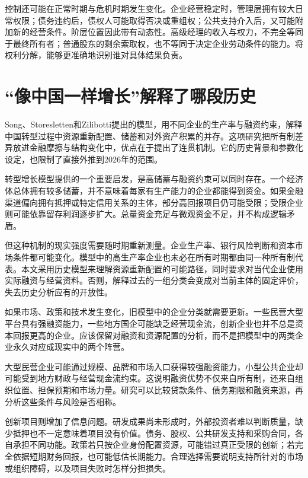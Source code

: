 \documentclass[UTF8,fontset=fandol,zihao=-4,oneside,openany]{ctexbook}
\begin{document}
控制还可能在正常时期与危机时期发生变化。企业经营稳定时，管理层拥有较大日常权限；债务违约后，债权人可能取得否决或重组权；公共支持介入后，又可能附加新的经营条件。阶层位置因此带有动态性。高级经理的收入与权力，不完全等同于最终所有者；普通股东的剩余索取权，也不等同于决定企业劳动条件的能力。将权利分解，能够更准确地识别谁对具体结果负责。

\section{“像中国一样增长”解释了哪段历史}
Song、Storesletten和Zilibotti提出的模型，用不同企业的生产率与融资约束，解释中国转型过程中资源重新配置、储蓄和对外资产积累的并存。这项研究把所有制差异放进金融摩擦与结构变化中，优点在于提出了连贯机制。它的历史背景和参数化设定，也限制了直接外推到2026年的范围。\cite{Song2011}

\label{arg:P082}
转型增长模型提供的一个重要启发，是高储蓄与融资约束可以同时存在。一个经济体总体拥有较多储蓄，并不意味着每家有生产能力的企业都能得到资金。如果金融渠道偏向拥有抵押或特定信用关系的主体，部分高回报项目仍可能受限；受限企业则可能依靠留存利润逐步扩大。总量资金充足与微观资金不足，并不构成逻辑矛盾。

但这种机制的现实强度需要随时期重新测量。企业生产率、银行风险判断和资本市场条件都可能变化。模型中的高生产率企业也未必在所有时期都由同一种所有制代表。本文采用历史模型来理解资源重新配置的可能路径，同时要求对当代企业使用实际融资与经营资料。否则，解释过去的一组分类会变成对当前主体的固定评价，失去历史分析应有的开放性。

如果市场、政策和技术发生变化，旧模型中的企业分类就需要更新。一些民营大型平台具有强融资能力，一些地方国企可能缺乏经营现金流，创新企业也并不总是资本回报更高的企业。应该保留对融资和资源配置的分析，而不是把模型中的两类企业永久对应成现实中的两个阵营。

\label{arg:P083}
大型民营企业可能通过规模、品牌和市场入口获得较强融资能力，小型公共企业却可能受到地方财政与经营现金流约束。这说明融资优势不仅来自所有制，还来自组织位置、担保预期和市场力量。研究可以比较贷款条件、债务期限和融资来源，再分析这些条件与风险是否相称。

创新项目则增加了信息问题。研发成果尚未形成时，外部投资者难以判断质量，缺少抵押也不一定意味着项目没有价值。债务、股权、公共研发支持和采购合同，各自承担不同功能。政策若只按企业身份配置资源，可能错过真正受限的创新；若完全依据短期财务回报，也可能低估长期能力。合理选择需要说明支持所针对的市场或组织障碍，以及项目失败时怎样分担损失。
\end{document}
